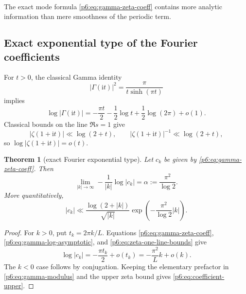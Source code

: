 \documentclass[11pt]{article}
\numberwithin{equation}{section}
\newtheorem{theorem}{Theorem}[section]
\theoremstyle{definition}
\theoremstyle{remark}
\newcommand{\ii}{\mathrm i}
\begin{document}
The exact mode formula \eqref{p6:eq:gamma-zeta-coeff} contains more analytic information than
mere smoothness of the periodic term.

\subsection{Exact exponential type of the Fourier coefficients}

For $t>0$, the classical Gamma identity \cite{p6:dlmf}
\begin{equation}
 |\Gamma(\ii t)|^2=\frac{\pi}{t\sinh(\pi t)}
 \label{p6:eq:gamma-modulus}
\end{equation}
implies
\begin{equation}
 \log|\Gamma(\ii t)|
 =-\frac{\pi t}{2}-\frac12\log t+\frac12\log(2\pi)+o(1).
 \label{p6:eq:gamma-log-asymptotic}
\end{equation}
Classical bounds on the line $\Re s=1$ \cite{p6:titchmarsh,p6:trudgian2014,p6:trudgian2015} give
\begin{equation}
 |\zeta(1+\ii t)|\ll\log(2+t),
 \qquad
 |\zeta(1+\ii t)|^{-1}\ll\log(2+t),
 \label{p6:eq:zeta-one-line-bounds}
\end{equation}
so $\log|\zeta(1+\ii t)|=o(t)$.

\begin{theorem}[exact Fourier exponential type]
\label{p6:thm:coefficient-type}
Let $c_k$ be given by \eqref{p6:eq:gamma-zeta-coeff}.  Then
\begin{equation}
 \boxed{\displaystyle
 \lim_{|k|\to\infty}-\frac{1}{|k|}\log|c_k|
 =\alpha:=\frac{\pi^2}{\log2}.}
 \label{p6:eq:exact-coefficient-type}
\end{equation}
More quantitatively,
\begin{equation}
 |c_k|
 \ll\frac{\log(2+|k|)}{\sqrt{|k|}}
 \exp\!\left(-\frac{\pi^2}{\log2}|k|\right).
 \label{p6:eq:coefficient-upper}
\end{equation}
\end{theorem}

\begin{proof}
For $k>0$, put $t_k=2\pi k/L$.  Equations
\eqref{p6:eq:gamma-zeta-coeff}, \eqref{p6:eq:gamma-log-asymptotic}, and
\eqref{p6:eq:zeta-one-line-bounds} give
\[
 \log|c_k|=-\frac{\pi t_k}{2}+o(t_k)
 =-\frac{\pi^2}{L}k+o(k).
\]
The $k<0$ case follows by conjugation.  Keeping the elementary prefactor in
\eqref{p6:eq:gamma-modulus} and the upper zeta bound gives
\eqref{p6:eq:coefficient-upper}.
\end{proof}
\end{document}

